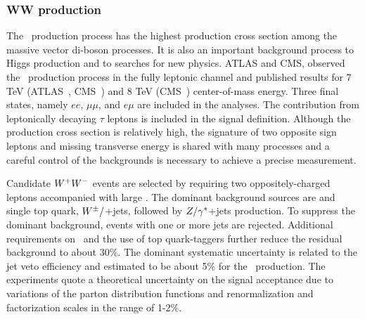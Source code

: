 \subsubsection{WW production}
\label{sss-WWprod}

The \WW\ production process has the highest production cross section
among the massive vector di-boson processes. It is also an important
background process to Higgs production and to searches for new physics.
ATLAS and CMS, observed the \WW\ production process in 
the fully leptonic channel and published results for 7 TeV 
(ATLAS~\cite{ATLAS:2012mec}, CMS~\cite{Chatrchyan:2013yaa}) and
8 TeV (CMS~\cite{Chatrchyan:2013oev}) center-of-mass energy. 
Three final states, namely $ee$, $\mu\mu$, and $e\mu$ are included in the analyses. 
The contribution from leptonically decaying $\tau$ leptons is included in the signal
definition. Although the production cross section is relatively high, the signature of two opposite 
sign leptons and missing transverse energy is shared with many processes and a careful
control of the backgrounds is necessary to achieve a precise measurement.


Candidate $W^+W^-$ events are selected by requiring two oppositely-charged leptons 
accompanied with large \MET. 
The dominant background sources are \ttbar\; and single top quark, 
$W^{\pm}/$+jets, followed by $Z/\gamma^{*}$+jets production.
To suppress the dominant \ttbar\; background, events with one or more jets are rejected.   
Additional requirements on \MET\ and the use of top quark-taggers further reduce the residual background
to about 30\%.  
The dominant systematic uncertainty is related to the jet veto efficiency 
and estimated to be about 5\% for the \WW\, production. 
The experiments quote a theoretical uncertainty on the signal acceptance due to 
variations of the parton distribution functions and renormalization and factorization 
scales in the range of 1-2\%.

